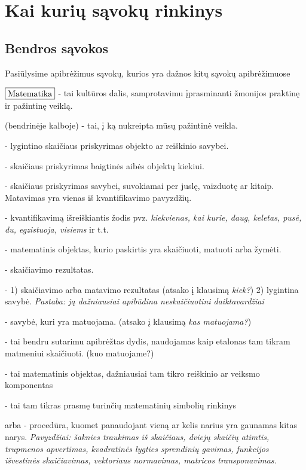 \documentclass{article}
\begin{document}
\section{Kai kurių sąvokų rinkinys}
\subsection*{Bendros sąvokos}
Pasiūlysime apibrėžimus sąvokų, kurios yra dažnos kitų sąvokų apibrėžimuose

$\fbox{Matematika}$ - tai kultūros dalis, samprotavimu įprasminanti žmonijos praktinę ir pažintinę veiklą.\par
{} (bendrinėje kalboje) - tai, į ką nukreipta mūsų pažintinė veikla.\par
{} - lygintino skaičiaus priskyrimas objekto ar reiškinio savybei.\par
{} - skaičiaus priskyrimas baigtinės aibės objektų kiekiui.\par
{} - skaičiaus priskyrimas savybei, suvokiamai per juslę, vaizduotę ar kitaip. Matavimas yra vienas iš kvantifikavimo pavyzdžių.\par
{} - kvantifikavimą išreiškiantis žodis pvz. \textit{kiekvienas, kai kurie, daug, keletas, pusė, du, egzistuoja, visiems} ir t.t. \par
{} - matematinis objektas, kurio paskirtis yra skaičiuoti, matuoti arba žymėti.\par
{} - skaičiavimo rezultatas.\par
{} - 1) skaičiavimo arba matavimo rezultatas (atsako į klausimą \textit{kiek?}) 2) lygintina savybė. \textit{Pastaba: ją dažniausiai apibūdina neskaičiuotini daiktavardžiai}\par
{} - savybė, kuri yra matuojama. (atsako į klausimą \textit{kas matuojama?})\par
{} - tai bendru sutarimu apibrėžtas dydis, naudojamas kaip etalonas tam tikram matmeniui skaičiuoti. (kuo matuojame?)\par
{} - tai matematinis objektas, dažniausiai tam tikro reiškinio ar veiksmo komponentas \par
{} - tai tam tikras prasmę turinčių matematinių simbolių rinkinys \par
{} arba  - procedūra, kuomet panaudojant vieną ar kelis narius yra gaunamas kitas narys.\textit{ Pavyzdžiai: šaknies traukimas iš skaičiaus, dviejų skaičių atimtis, trupmenos apvertimas, kvadratinės lygties sprendinių gavimas, funkcijos išvestinės skaičiavimas, vektoriaus normavimas, matricos transponavimas.}\par
\end{document}
